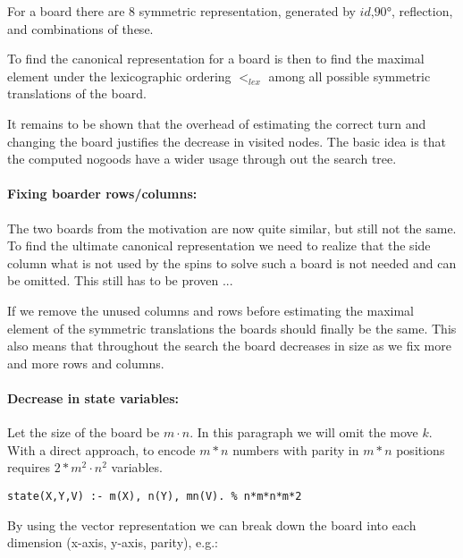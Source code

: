 \documentclass[]{llncs}
\newcommand{\spintable}[9]{ 
\node [matrix,ampersand replacement=\&,nodes={minimum size=4mm}]
{
    \node {#1}; \& \node{#2}; \& \node {#3}; \\ 
    \node {#4}; \& \node{#5}; \& \node {#6}; \\ 
    \node {#7}; \& \node{#8}; \& \node {#9}; \\ 
}; 
}
\begin{document}
For a board there are 8 symmetric representation, generated by $id$,$90°$,
reflection, and combinations of these. 

To find the canonical representation for a board is then to find the maximal element
under the lexicographic ordering $<_{lex}$ among all possible symmetric translations
of the board.

It remains to be shown that the overhead of estimating the correct turn and changing
the board justifies the decrease in visited nodes.  The basic idea is that the
computed nogoods have a wider usage through out the search tree.

\paragraph{Fixing boarder rows/columns: } The two boards from the motivation are now
quite similar, but still not the same. To find the ultimate canonical
representation we need to realize that the side column what is not used by the spins
to solve such a board is not needed and can be omitted. This still has to be proven
...

If we remove the unused columns and rows before estimating the maximal element of the
symmetric translations the boards should finally be the same. This also means that
throughout the search the board decreases in size as we fix more and more rows and
columns. 


\paragraph{Decrease in state variables: } Let the size of the board be $m\cdot n$. In
this paragraph we will omit the move $k$. With a direct approach, to encode $m*n$
numbers with parity in $m*n$ positions requires $2*m^2\cdot n^2$ variables.
\begin{verbatim} 
state(X,Y,V) :- m(X), n(Y), mn(V). % n*m*n*m*2 
\end{verbatim} 
By using the vector representation we can break down the board into each dimension
(x-axis, y-axis, parity), e.g.: 

\end{document}
